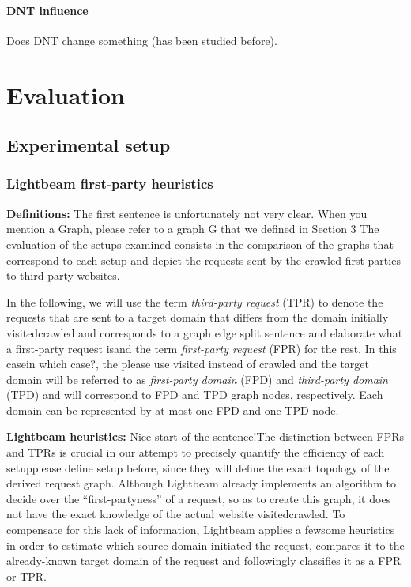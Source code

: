 \documentclass{sig-alternate}
\begin{document}
\paragraph{DNT influence}
Does DNT change something (has been studied before).

\section{Evaluation}

\subsection{Experimental setup}

\subsubsection{Lightbeam first-party heuristics}
\textbf{Definitions:} {\color{red}The first sentence is unfortunately not very clear. When you mention a Graph, please refer to a graph G that we defined in Section 3} The evaluation of the setups examined consists in the comparison of the graphs that correspond to each setup and depict the requests sent by the crawled first parties to third-party websites.

In the following, we will use the term \textit{third-party request} (TPR) to denote the requests that are sent to a target domain that differs from the domain initially {\color{red}visited}crawled and corresponds to a graph edge {\color{red}split sentence and elaborate what a first-party request is}and the term \textit{first-party request} (FPR) for the rest. In this case{\color{red}in which case?}, the {\color{red}please use visited instead of }crawled and the target domain will be referred to as \textit{first-party domain} (FPD) and \textit{third-party domain} (TPD) and will correspond to FPD and TPD graph nodes, respectively. Each domain can be represented by at most one FPD and one TPD node.

\textbf{Lightbeam heuristics:} {\color{red}Nice start of the sentence!}The distinction between FPRs and TPRs is crucial in our attempt to precisely quantify the efficiency of each setup{\color{red}please define setup before}, since they will define the exact topology of the derived request graph. Although Lightbeam already implements an algorithm to decide over the ``first-partyness'' of a request, so as to create this graph, it does not have the exact knowledge of the actual website {\color{red}visited}crawled. To compensate for this lack of information, Lightbeam applies {\color{red}a few}some heuristics in order to estimate which source domain initiated the request, compares it to the already-known target domain of the request and followingly classifies it as a FPR or TPR.
\end{document}
